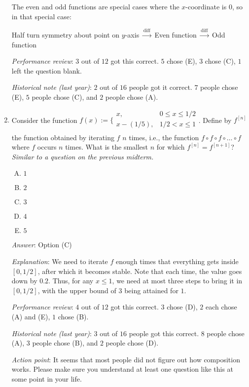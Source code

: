 \documentclass[10pt]{amsart}
\begin{document}
\begin{enumerate}
  The even and odd functions are special cases where the
  $x$-coordinate is $0$, so in that special case:

  Half turn symmetry about point on $y$-axis $\stackrel{\text{diff}}{\to}$
  Even function $\stackrel{\text{diff}}{\to}$ Odd function

  {\em Performance review}: $3$ out of $12$ got this correct. $5$
  chose (E), $3$ chose (C), $1$ left the question blank.

  {\em Historical note (last year)}: $2$ out of $16$ people
  got it correct. $7$ people chose (E), $5$ people chose (C), and $2$
  people chose (A).
\item Consider the function $f(x) := \lbrace\begin{array}{rl} x, & 0
  \le x \le 1/2 \\ x - (1/5), & 1/2 < x \le 1 \\\end{array}$. Define by
  $f^{[n]}$ the function obtained by iterating $f$ $n$ times, i.e.,
  the function $f \circ f \circ f \circ \dots \circ f$ where $f$
  occurs $n$ times. What is the smallest $n$ for which $f^{[n]} =
  f^{[n + 1]}$? {\em Similar to a question on the previous midterm.}

  \begin{enumerate}[(A)]
  \item $1$
  \item $2$
  \item $3$
  \item $4$
  \item $5$
  \end{enumerate}

  {\em Answer}: Option (C)

  {\em Explanation}: We need to iterate $f$ enough times that
  everything gets inside $[0,1/2]$, after which it becomes
  stable. Note that each time, the value goes down by $0.2$. Thus, for
  any $x \le 1$, we need at most three steps to bring it in $[0,1/2]$,
  with the upper bound of $3$ being attained for $1$.

  {\em Performance review}: $4$ out of $12$ got this correct. $3$
  chose (D), $2$ each chose (A) and (E), $1$ chose (B).

  {\em Historical note (last year)}: $3$ out of $16$ people
  got this correct. $8$ people chose (A), $3$ people chose (B), and
  $2$ people chose (D).

  {\em Action point}: It seems that most people did not figure out how
  composition works. Please make sure you understand at least one
  question like this at some point in your life.


\end{enumerate}
\end{document}
